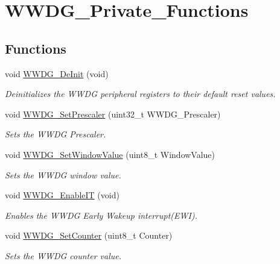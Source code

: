 \hypertarget{group___w_w_d_g___private___functions}{}\section{W\+W\+D\+G\+\_\+\+Private\+\_\+\+Functions}
\label{group___w_w_d_g___private___functions}
\subsection*{Functions}
\begin{DoxyCompactItemize}
\item 
void \mbox{\hyperlink{group___w_w_d_g___private___functions_ga7130f4dc861b9234b62e73f9f57f89a1}{W\+W\+D\+G\+\_\+\+De\+Init}} (void)
\begin{DoxyCompactList}\small\item\em Deinitializes the W\+W\+DG peripheral registers to their default reset values. \end{DoxyCompactList}\item 
void \mbox{\hyperlink{group___w_w_d_g___private___functions_gafeaa2b52c31ba7baca7eb61d2d42e07b}{W\+W\+D\+G\+\_\+\+Set\+Prescaler}} (uint32\+\_\+t W\+W\+D\+G\+\_\+\+Prescaler)
\begin{DoxyCompactList}\small\item\em Sets the W\+W\+DG Prescaler. \end{DoxyCompactList}\item 
void \mbox{\hyperlink{group___w_w_d_g___private___functions_gaf44a7bf8bf6b11b41cd89ff521fdd5a5}{W\+W\+D\+G\+\_\+\+Set\+Window\+Value}} (uint8\+\_\+t Window\+Value)
\begin{DoxyCompactList}\small\item\em Sets the W\+W\+DG window value. \end{DoxyCompactList}\item 
void \mbox{\hyperlink{group___w_w_d_g___private___functions_gac8af66ea5254d3d78b60b9b7c7f29521}{W\+W\+D\+G\+\_\+\+Enable\+IT}} (void)
\begin{DoxyCompactList}\small\item\em Enables the W\+W\+DG Early Wakeup interrupt(\+E\+W\+I). \end{DoxyCompactList}\item 
void \mbox{\hyperlink{group___w_w_d_g___private___functions_ga6e44cc35f133b28b9ad861f459bf8d76}{W\+W\+D\+G\+\_\+\+Set\+Counter}} (uint8\+\_\+t Counter)
\begin{DoxyCompactList}\small\item\em Sets the W\+W\+DG counter value. \end{DoxyCompactList}\item 

\end{DoxyCompactItemize}
